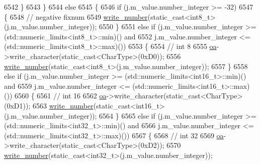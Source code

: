 \begin{DoxyCode}
6542                     \}
6543                 \}
6544                 \textcolor{keywordflow}{else}
6545                 \{
6546                     \textcolor{keywordflow}{if} (j.m\_value.number\_integer >= -32)
6547                     \{
6548                         \textcolor{comment}{// negative fixnum}
6549                         \hyperlink{classnlohmann_1_1detail_1_1binary__writer_a62cfd50a511371e718f37ad7bb29ae9d}{write\_number}(static\_cast<int8\_t>(j.m\_value.number\_integer));
6550                     \}
6551                     \textcolor{keywordflow}{else} \textcolor{keywordflow}{if} (j.m\_value.number\_integer >= (std::numeric\_limits<int8\_t>::min)() and
6552                              j.m\_value.number\_integer <= (std::numeric\_limits<int8\_t>::max)())
6553                     \{
6554                         \textcolor{comment}{// int 8}
6555                         \hyperlink{classnlohmann_1_1detail_1_1binary__writer_a6f15b782a7900f50ef37d123008e601b}{oa}->write\_character(static\_cast<CharType>(0xD0));
6556                         \hyperlink{classnlohmann_1_1detail_1_1binary__writer_a62cfd50a511371e718f37ad7bb29ae9d}{write\_number}(static\_cast<int8\_t>(j.m\_value.number\_integer));
6557                     \}
6558                     \textcolor{keywordflow}{else} \textcolor{keywordflow}{if} (j.m\_value.number\_integer >= (std::numeric\_limits<int16\_t>::min)() and
6559                              j.m\_value.number\_integer <= (std::numeric\_limits<int16\_t>::max)())
6560                     \{
6561                         \textcolor{comment}{// int 16}
6562                         \hyperlink{classnlohmann_1_1detail_1_1binary__writer_a6f15b782a7900f50ef37d123008e601b}{oa}->write\_character(static\_cast<CharType>(0xD1));
6563                         \hyperlink{classnlohmann_1_1detail_1_1binary__writer_a62cfd50a511371e718f37ad7bb29ae9d}{write\_number}(static\_cast<int16\_t>(j.m\_value.number\_integer));
6564                     \}
6565                     \textcolor{keywordflow}{else} \textcolor{keywordflow}{if} (j.m\_value.number\_integer >= (std::numeric\_limits<int32\_t>::min)() and
6566                              j.m\_value.number\_integer <= (std::numeric\_limits<int32\_t>::max)())
6567                     \{
6568                         \textcolor{comment}{// int 32}
6569                         \hyperlink{classnlohmann_1_1detail_1_1binary__writer_a6f15b782a7900f50ef37d123008e601b}{oa}->write\_character(static\_cast<CharType>(0xD2));
6570                         \hyperlink{classnlohmann_1_1detail_1_1binary__writer_a62cfd50a511371e718f37ad7bb29ae9d}{write\_number}(static\_cast<int32\_t>(j.m\_value.number\_integer));

\end{DoxyCode}
